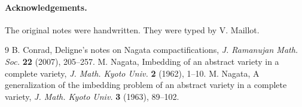 \documentclass[11pt]{article}
\begin{document}
\paragraph{Acknowledgements.}
The original notes were handwritten. They were typed by V. Maillot.

\begin{thebibliography}{9}
 B. Conrad, Deligne's notes on Nagata compactifications, \emph{J. Ramanujan Math. Soc.} \textbf{22} (2007), 205--257.
 M. Nagata, Imbedding of an abstract variety in a complete variety, \emph{J. Math. Kyoto Univ.} \textbf{2} (1962), 1--10.
 M. Nagata, A generalization of the imbedding problem of an abstract variety in a complete variety, \emph{J. Math. Kyoto Univ.} \textbf{3} (1963), 89--102.
\end{thebibliography}
\end{document}
